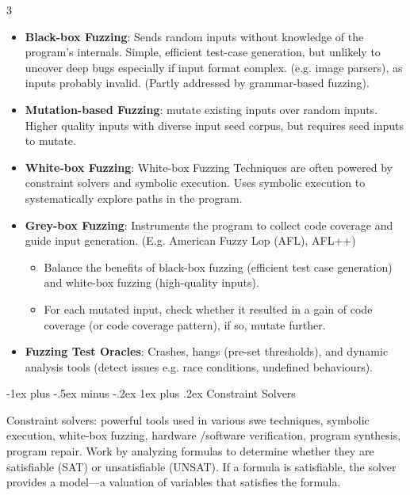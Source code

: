\documentclass[a4paper, 10pt, landscape]{article}
\makeatletter
\renewcommand{\subsubsection}{\@startsection{subsubsection}{3}{0mm}%
                                {-1ex plus -.5ex minus -.2ex}%
                                {1ex plus .2ex}%
                                {\normalfont\small\bfseries}}
\makeatother
\begin{document}
\begin{multicols*}{3}
\begin{itemize}
\item \textbf{Black-box Fuzzing}: Sends random inputs without knowledge of the program's internals. Simple, efficient test-case generation, but unlikely to uncover deep bugs especially if input format complex. (e.g. image parsers), as inputs probably invalid. (Partly addressed by grammar-based fuzzing).
\item \textbf{Mutation-based Fuzzing}: mutate existing inputs over random inputs. Higher quality inputs with diverse input seed corpus, but requires seed inputs to mutate.
\item \textbf{White-box Fuzzing}:  White-box Fuzzing Techniques are often powered by constraint 
solvers and symbolic execution. Uses symbolic execution to systematically explore paths in the program.
\item \textbf{Grey-box Fuzzing}: Instruments the program to collect code coverage and guide input generation.  (E.g.  American Fuzzy Lop (AFL), AFL++)
	\begin{itemize}
	\item  Balance the benefits of black-box fuzzing (efficient test case generation) and white-box fuzzing (high-quality inputs). 
	\item For each mutated input, check whether it resulted in a gain of code coverage (or code coverage pattern), if so, mutate further.
	\end{itemize}
\item \textbf{Fuzzing Test Oracles}:  Crashes, hangs (pre-set thresholds), and dynamic analysis tools (detect issues e.g. race conditions, undefined behaviours).
\end{itemize}

\subsubsection{Constraint Solvers}

Constraint solvers: powerful tools used in various swe techniques, symbolic execution, white-box fuzzing, hardware /software verification, program synthesis, program repair. Work by analyzing formulas to determine whether they are satisfiable (SAT) or unsatisfiable (UNSAT). If a formula is satisfiable, the solver provides a model—a valuation of variables that satisfies the formula. \\


\end{multicols*}
\end{document}
